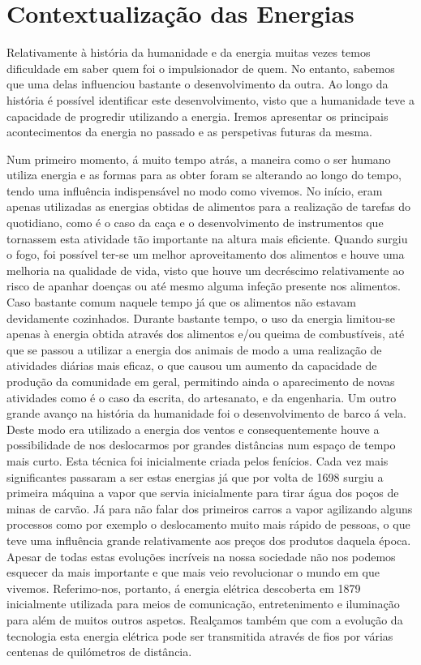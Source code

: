 \documentclass{report}
\begin{document}
\label{chap.metodologia}


\chapter{Contextualização das Energias}
Relativamente à história da humanidade e da energia muitas vezes temos dificuldade em saber quem foi o impulsionador de quem. No entanto, sabemos que uma delas influenciou bastante o desenvolvimento da outra. Ao longo da história é possível identificar este desenvolvimento, visto que a humanidade teve a capacidade de progredir utilizando a energia. Iremos apresentar os principais acontecimentos da energia no passado e as perspetivas futuras da mesma.

Num primeiro momento, á muito tempo atrás, a maneira como o ser humano utiliza energia e as formas para as obter foram se alterando ao longo do tempo, tendo uma influência indispensável no modo como vivemos. No início, eram apenas utilizadas as energias obtidas de alimentos para a realização de tarefas do quotidiano, como é o caso da caça e o desenvolvimento de instrumentos que tornassem esta atividade tão importante na altura mais eficiente. Quando surgiu o fogo, foi possível ter-se um melhor aproveitamento dos alimentos e houve uma melhoria na qualidade de vida, visto que houve um decréscimo relativamente ao risco de apanhar doenças ou até mesmo alguma infeção presente nos alimentos. Caso bastante comum naquele tempo já que os alimentos não estavam devidamente cozinhados.  Durante bastante tempo, o uso da energia limitou-se apenas à energia obtida através dos alimentos e/ou queima de combustíveis, até que se passou a utilizar a energia dos animais de modo a uma realização de atividades diárias mais eficaz, o que causou um aumento da capacidade de produção da comunidade em geral, permitindo ainda o aparecimento de novas atividades como é o caso da escrita, do artesanato, e da engenharia. Um outro grande avanço na história da humanidade foi o desenvolvimento de barco á vela. Deste modo era utilizado a energia dos ventos e consequentemente houve a possibilidade de nos deslocarmos por grandes distâncias num espaço de tempo mais curto. Esta técnica foi inicialmente criada pelos fenícios. Cada vez mais significantes passaram a ser estas energias já que por volta de 1698 surgiu a primeira máquina a vapor que servia inicialmente para tirar água dos poços de minas de carvão. Já para não falar dos primeiros carros a vapor agilizando alguns processos como por exemplo o deslocamento muito mais rápido de pessoas, o que teve uma influência grande relativamente aos preços dos produtos daquela época. Apesar de todas estas evoluções incríveis na nossa sociedade não nos podemos esquecer da mais importante e que mais veio revolucionar o mundo em que vivemos. Referimo-nos, portanto, á energia elétrica descoberta em 1879 inicialmente utilizada para meios de comunicação, entretenimento e iluminação para além de muitos outros aspetos. Realçamos também que com a evolução da tecnologia esta energia elétrica pode ser transmitida através de fios por várias centenas de quilómetros de distância.
\end{document}
